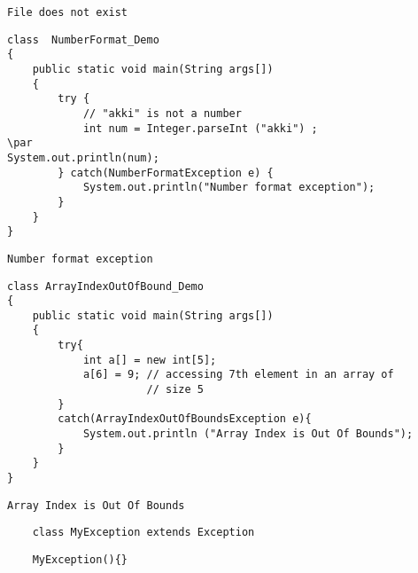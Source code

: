 \documentclass{book}
\def\lthtmlcheckvsize{\ifdim\ht\sizebox<\vsize 
  \ifdim\wd\sizebox<\hsize\expandafter\hfill\fi \expandafter\vfill
  \else\expandafter\vss\fi}%
\begin{document}
{\newpage\clearpage
{}%
\begin{lstlisting}
File does not exist
\end{lstlisting}%
\lthtmlfigureZ
\lthtmlcheckvsize\clearpage}

{\newpage\clearpage
{}%
\begin{lstlisting}
class  NumberFormat_Demo 
{ 
    public static void main(String args[]) 
    { 
        try { 
            // "akki" is not a number 
            int num = Integer.parseInt ("akki") ; 
\par
System.out.println(num); 
        } catch(NumberFormatException e) { 
            System.out.println("Number format exception"); 
        } 
    } 
} 
\end{lstlisting}%
\lthtmlfigureZ
\lthtmlcheckvsize\clearpage}

{\newpage\clearpage
{}%
\begin{lstlisting}
Number format exception
\end{lstlisting}%
\lthtmlfigureZ
\lthtmlcheckvsize\clearpage}

{\newpage\clearpage
{}%
\begin{lstlisting}
class ArrayIndexOutOfBound_Demo 
{ 
    public static void main(String args[]) 
    { 
        try{ 
            int a[] = new int[5]; 
            a[6] = 9; // accessing 7th element in an array of 
                      // size 5 
        } 
        catch(ArrayIndexOutOfBoundsException e){ 
            System.out.println ("Array Index is Out Of Bounds"); 
        } 
    } 
} 
\end{lstlisting}%
\lthtmlfigureZ
\lthtmlcheckvsize\clearpage}

{\newpage\clearpage
{}%
\begin{lstlisting}
Array Index is Out Of Bounds
\end{lstlisting}%
\lthtmlfigureZ
\lthtmlcheckvsize\clearpage}

{\newpage\clearpage
{}%
\begin{lstlisting}
	class MyException extends Exception
	\end{lstlisting}%
\lthtmlfigureZ
\lthtmlcheckvsize\clearpage}

{\newpage\clearpage
{}%
\begin{lstlisting}
	MyException(){}
	\end{lstlisting}%
\lthtmlfigureZ
\lthtmlcheckvsize\clearpage}
\end{document}
